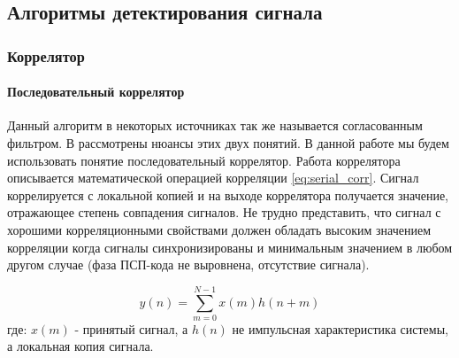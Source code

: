 \subsection{Алгоритмы детектирования сигнала}

\subsubsection{Коррелятор}

\paragraph{Последовательный коррелятор}
\label{sec1_serial}
Данный алгоритм в некоторых источниках так же называется согласованным фильтром. В \cite{sklyar} рассмотрены нюансы этих двух понятий.
В данной работе мы будем использовать понятие последовательный коррелятор. Работа коррелятора описывается математической операцией
корреляции \ref{eq:serial_corr}. Сигнал коррелируется с локальной копией и на выходе коррелятора получается значение, отражающее
степень совпадения сигналов. Не трудно представить, что сигнал с хорошими корреляционными свойствами должен обладать высоким значением
корреляции когда сигналы синхронизированы и минимальным значением в любом другом случае (фаза ПСП-кода не выровнена, отсутствие сигнала).

\begin{equation}
	\label{eq:serial_corr}
	y(n)=\sum\limits_{m=0}^{N-1}{x(m)h(n+m)}
\end{equation}
где: ${x(m)}$ - принятый сигнал, а ${h(n)}$ не импульсная характеристика системы, а локальная копия сигнала.
